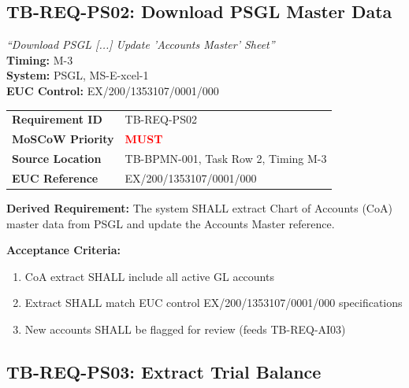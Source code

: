 \subsection{TB-REQ-PS02: Download PSGL Master Data}
\label{req:tb-req-ps02}

\begin{tcolorbox}[colback=sourcegreen!5,colframe=sourcegreen!70,title=BPMN Task Extract]
\textit{``Download PSGL [...] Update 'Accounts Master' Sheet''}\\
\textbf{Timing:} M-3\\
\textbf{System:} PSGL, MS-E-xcel-1\\
\textbf{EUC Control:} EX/200/1353107/0001/000
\end{tcolorbox}

\begin{tabularx}{\textwidth}{@{}lX@{}}
\toprule
\textbf{Requirement ID} & TB-REQ-PS02 \\
\textbf{MoSCoW Priority} & \textcolor{red}{\textbf{MUST}} \\
\textbf{Source Location} & TB-BPMN-001, Task Row 2, Timing M-3 \\
\textbf{EUC Reference} & EX/200/1353107/0001/000 \\
\bottomrule
\end{tabularx}

\textbf{Derived Requirement:} The system SHALL extract Chart of Accounts (CoA) 
master data from PSGL and update the Accounts Master reference.

\textbf{Acceptance Criteria:}
\begin{enumerate}[label=AC-PS02-\arabic*:]
    \item CoA extract SHALL include all active GL accounts
    \item Extract SHALL match EUC control EX/200/1353107/0001/000 specifications
    \item New accounts SHALL be flagged for review (feeds TB-REQ-AI03)
\end{enumerate}

\subsection{TB-REQ-PS03: Extract Trial Balance}
\label{req:tb-req-ps03}

